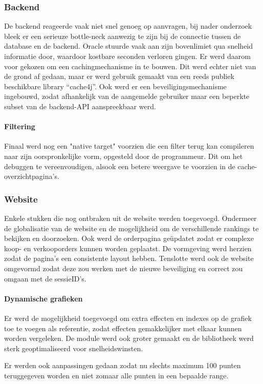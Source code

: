 \subsubsection{Backend}
De backend reageerde vaak niet snel genoeg op aanvragen, bij nader onderzoek bleek er een serieuze bottle-neck aanwezig te zijn bij de connectie tussen de database en de backend. Oracle stuurde vaak aan zijn bovenlimiet qua snelheid informatie door, waardoor kostbare seconden verloren gingen. Er werd daarom voor gekozen om een cachingmechanisme in te bouwen. Dit werd echter niet van de grond af gedaan, maar er werd gebruik gemaakt van een reeds publiek beschikbare library ``cache4j''.
Ook werd er een beveiligingsmechanisme ingebouwd, zodat afhankelijk van de aangemelde gebruiker maar een beperkte subset van de backend-API aanspreekbaar werd.

\paragraph{Filtering}
Finaal werd nog een "native target" voorzien die een filter terug kan compileren naar zijn oorspronkelijke vorm, opgesteld door de programmeur. Dit om het debuggen te vereenvoudigen, alsook een betere weergave te voorzien in de cache-overzichtpagina's.

\subsubsection{Website}
Enkele stukken die nog ontbraken uit de website werden toegevoegd. Ondermeer de globalisatie van de website en de mogelijkheid om de verschillende rankings te bekijken en doorzoeken. Ook werd de orderpagina ge\"updatet zodat er complexe koop- en verkooporders kunnen worden geplaatst. De vormgeving werd herzien zodat de pagina's een consistente layout hebben.
Tenslotte werd ook de website omgevormd zodat deze zou werken met de nieuwe beveiliging en correct zou omgaan met de sessieID's.

\paragraph{Dynamische grafieken}
Er werd de mogelijkheid toegevoegd om extra effecten en indexes op de grafiek toe te voegen als referentie, zodat effecten gemakkelijker met elkaar kunnen worden vergeleken. 
De module werd ook groter gemaakt en de bibliotheek werd sterk geoptimaliseerd voor snelheidswinsten.

Er werden ook aanpassingen gedaan zodat nu slechts maximum 100 punten teruggegeven worden en niet zomaar alle punten in een bepaalde range.

